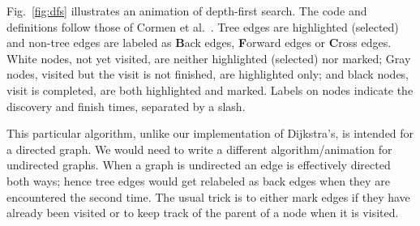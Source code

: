 

Fig.~\ref{fig:dfs} illustrates an animation of depth-first search.
The code and definitions follow those of Cormen et al.~\cite{2009-Intro_to_Algorithms-Cormen}.
Tree edges are highlighted (selected)
and non-tree edges are labeled as \textbf{B}ack edges,
\textbf{F}orward edges or \textbf{C}ross edges.
White nodes, not yet visited,
are neither highlighted (selected) nor marked;
Gray nodes, visited but the visit is not finished, are highlighted only;
and black nodes, visit is completed, are both highlighted and 
marked.
Labels on nodes indicate the discovery and finish times, separated by a slash.

This particular algorithm, unlike our implementation of Dijkstra's,
is intended for a directed graph.
We would
need to write a different algorithm/animation
for undirected graphs.
When a graph is undirected an
edge is effectively directed both ways;
hence
tree
edges would get relabeled as back edges when they are encountered the second time.
The usual trick is to either mark edges if they have already been visited
or to keep track of the parent of a node when it is visited.
